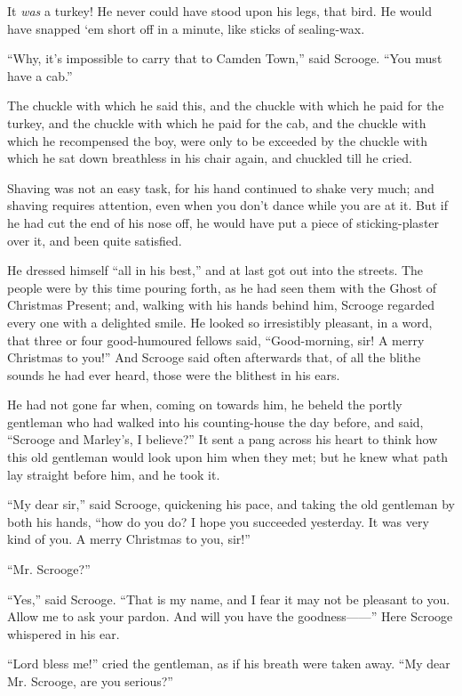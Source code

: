 \documentclass[paper=a5,BCOR=15mm,twoside,DIV=15,headinclude=off,12pt,chapterprefix=off,openany,headings=huge]{scrbook} %
\begin{document}
It \textit{was} a turkey! He never could have stood upon his legs, that bird. He would have snapped `em short off in a minute, like sticks of sealing-wax.

\enquote{Why, it's impossible to carry that to Camden Town,} said Scrooge. \enquote{You must have a cab.}

The chuckle with which he said this, and the chuckle with which he paid for the turkey, and the chuckle with which he paid for the cab, and the chuckle with which he recompensed the boy, were only to be exceeded by the chuckle with which he sat down breathless in his chair again, and chuckled till he cried.

Shaving was not an easy task, for his hand continued to shake very much; and shaving requires attention, even when you don't dance while you are at it. But if he had cut the end of his nose off, he would have put a piece of sticking-plaster over it, and been quite satisfied.

He dressed himself \enquote{all in his best,} and at last got out into the streets. The people were by this time pouring forth, as he had seen them with the Ghost of Christmas Present; and, walking with his hands behind him, Scrooge regarded every one with a delighted smile. He looked so irresistibly pleasant, in a word, that three or four good-humoured fellows said, \enquote{Good-morning, sir! A merry Christmas to you!} And Scrooge said often afterwards that, of all the blithe sounds he had ever heard, those were the blithest in his ears.

He had not gone far when, coming on towards him, he beheld the portly gentleman who had walked into his counting-house the day before, and said, \enquote{Scrooge and Marley's, I believe?} It sent a pang across his heart to think how this old gentleman would look upon him when they met; but he knew what path lay straight before him, and he took it.

\enquote{My dear sir,} said Scrooge, quickening his pace, and taking the old gentleman by both his hands, \enquote{how do you do? I hope you succeeded yesterday. It was very kind of you. A merry Christmas to you, sir!}

\enquote{Mr. Scrooge?}

\enquote{Yes,} said Scrooge. \enquote{That is my name, and I fear it may not be pleasant to you. Allow me to ask your pardon. And will you have the goodness——} Here Scrooge whispered in his ear.

\enquote{Lord bless me!} cried the gentleman, as if his breath were taken away. \enquote{My dear Mr. Scrooge, are you serious?}
\end{document}
